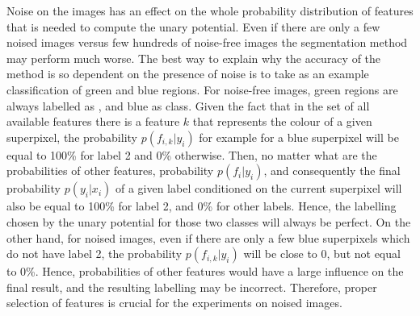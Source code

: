 Noise on the images has an effect on the whole probability distribution of features that is needed to compute the unary potential. Even if there are only a few noised images versus few hundreds of noise-free images the segmentation method may perform much worse. The best way to explain why the accuracy of the method is so dependent on the presence of noise is to take as an example classification of green and blue regions. For noise-free images, green regions are always labelled as , and blue as  class. Given the fact that in the set of all available features there is a feature $k$ that represents the colour of a given superpixel, the probability $p(f_{i,k}|y_i)$ for example for a blue superpixel will be equal to 100\% for label 2 and 0\% otherwise. Then, no matter what are the probabilities of other features, probability $p(f_i|y_i)$, and consequently the final probability $p(y_i|x_i)$ of a given label conditioned on the current superpixel will also be equal to 100\% for label 2, and 0\% for other labels. Hence, the labelling chosen by the unary potential for those two classes will always be perfect. On the other hand, for noised images, even if there are only a few blue superpixels which do not have label 2, the probability $p(f_{i,k}|y_i)$ will be close to 0, but not equal to 0\%. Hence, probabilities of other features would have a large influence on the final result, and the resulting labelling may be incorrect. Therefore, proper selection of features is crucial for the experiments on noised images.  

